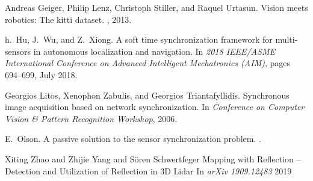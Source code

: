 \documentclass[conference]{IEEEtran}
\begin{document}
\begin{thebibliography}{00}
Andreas Geiger, Philip Lenz, Christoph Stiller, and Raquel Urtasun.
\newblock Vision meets robotics: The kitti dataset.
, 2013.

h.~{Hu}, J.~{Wu}, and Z.~{Xiong}.
\newblock A soft time synchronization framework for multi-sensors in autonomous
  localization and navigation.
\newblock In {\em 2018 IEEE/ASME International Conference on Advanced
  Intelligent Mechatronics (AIM)}, pages 694--699, July 2018.

Georgios Litos, Xenophon Zabulis, and Georgios Triantafyllidis.
\newblock Synchronous image acquisition based on network synchronization.
\newblock In {\em Conference on Computer Vision \& Pattern Recognition
  Workshop}, 2006.

E.~Olson.
\newblock A passive solution to the sensor synchronization problem.
.

Xiting Zhao and Zhijie Yang and Sören Schwertfeger
\newblock Mapping with Reflection -- Detection and Utilization of Reflection in 3D Lidar \newblock In {\em arXiv 1909.12483} 2019

\end{thebibliography}
\end{document}

